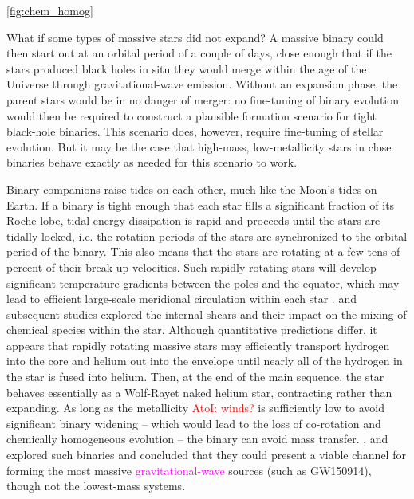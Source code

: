 \documentclass[iop,onecolumn]{revtex4}
\newcommand{\ajf}[1]{\textcolor{red}{AtoI: #1}}
\newcommand{\ilya}[1]{\textcolor{magenta}{#1}}
\begin{document}
\autoref{fig:chem_homog}

What if some types of massive stars did not expand? A massive binary could then start out at an orbital period of a couple of days, close enough that if the stars produced black holes in situ they would merge within the age of the Universe through gravitational-wave emission. Without an expansion phase, the parent stars would be in no danger of merger: no fine-tuning of binary evolution would then be required to construct a plausible formation scenario for tight black-hole binaries. This scenario does, however, require fine-tuning of stellar evolution. But it may be the case that high-mass, low-metallicity stars in close binaries behave exactly as needed for this scenario to work.

Binary companions raise tides on each other, much like the Moon's tides on Earth.  If a binary is tight enough that each star fills a significant fraction of its Roche lobe, tidal energy dissipation is rapid and proceeds until the stars are tidally locked, i.e. the rotation periods of the stars are synchronized to the orbital period of the binary. This also means that the stars are rotating at a few tens of percent of their break-up velocities.  Such rapidly rotating stars will develop significant temperature gradients between the poles and the equator, which may lead to efficient large-scale meridional circulation within each star \citep{Eddington:1925,Sweet:1950}.  \citet{EndalSofia:1978} and subsequent studies \citep[e.g.,][]{Heger:2000,MaederMeynet:2000,Yoon:2006} explored the internal shears and their impact on the mixing of chemical species within the star.  Although quantitative predictions differ, it appears that rapidly rotating massive stars may efficiently transport hydrogen into the core and helium out into the envelope until nearly all of the hydrogen in the star is fused into helium.  Then, at the end of the main sequence, the star behaves essentially as a Wolf-Rayet naked helium star, contracting rather than expanding. As long as the metallicity \ajf{winds?} is sufficiently low to avoid significant binary widening -- which would lead to the loss of co-rotation and chemically homogeneous evolution \citep{deMink:2009} -- the binary can avoid mass transfer.  \citet{MandeldeMink:2016,deMinkMandel:2016}, and \citet{Marchant:2016} explored such binaries and concluded that they could present a viable channel for forming the most massive \ilya{gravitational-wave} sources (such as GW150914), though not the lowest-mass systems.
\end{document}
